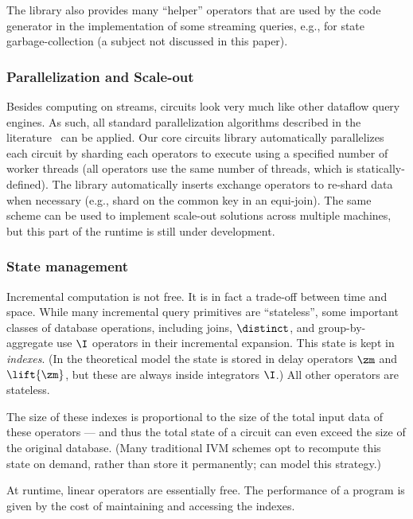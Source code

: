 The library also provides many ``helper'' operators that are used by
the code generator in the implementation of some streaming queries,
e.g., for state garbage-collection (a subject not discussed in this
paper).

\subsubsection{Parallelization and Scale-out}

Besides computing on streams, \dbsp circuits look very much like other
dataflow query engines.  As such, all standard parallelization
algorithms described in the literature~\cite{Graefe-sigmod90} can be
applied.  Our core circuits library automatically parallelizes each
circuit by sharding each operators to execute using a specified number
of worker threads (all operators use the same number of threads, which
is statically-defined).  The library automatically inserts exchange
operators to re-shard data when necessary (e.g., shard on the common
key in an equi-join).  The same scheme can be used to implement
scale-out solutions across multiple machines, but this part of the
runtime is still under development.

\subsubsection{State management}\label{sec:state-management}

Incremental computation is not free.  It is in fact a trade-off
between time and space.  While many incremental query primitives are
``stateless'', some important classes of database operations,
including joins, $\distinct$, and group-by-aggregate use $\I$
operators in their incremental expansion.  This state is kept in
\emph{indexes}.  (In the \dbsp theoretical model the state is stored
in delay operators $\zm$ and $\lift{\zm}$, but these are always inside
integrators $\I$.)  All other operators are stateless.

The size of these indexes is proportional to the size of the total
input data of these operators --- and thus the total state of a
circuit can even exceed the size of the original database.  (Many
traditional IVM schemes opt to recompute this state on demand, rather
than store it permanently; \dbsp can model this strategy.)

At runtime, linear operators are essentially free.  The performance of
a \dbsp program is given by the cost of maintaining and
accessing the indexes.

